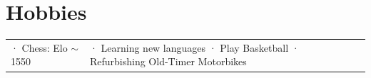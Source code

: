 \documentclass[letterpaper,11pt]{article}
\begin{document}
\section{Hobbies}
\begin{tabular}{ l l l}
    
    \quad \small · Chess:  Elo $\sim$ 1550 \quad \quad \quad &\small \quad · Learning new languages \quad \quad · \small Play Basketball \quad \quad · Refurbishing Old-Timer Motorbikes 
\end{tabular}
\end{document}
